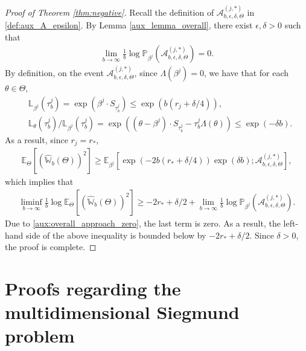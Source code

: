 \documentclass[aap,preprint]{imsart}
\newcommand{\Pro}{{\mathbb{P}}}
\newcommand{\Exp}{{\mathbb{E}}}
\theoremstyle{plain}
\theoremstyle{definition}
\begin{document}
\begin{appendix}
\begin{proof}[Proof of Theorem \ref{thm:negative}]
Recall the definition of $\mathcal{A}_{b,\epsilon,\delta,\Theta}^{(j,*)}$ in \eqref{def:aux_A_epsilon}. By Lemma \ref{aux_lemma_overall}, there exist  $\epsilon, \delta > 0$ such that
    \begin{align}\label{aux:overall_approach_zero}
       \lim_{b \to \infty}  \frac{1}{b} \log \Pro_{\beta^j}\left(\mathcal{A}_{b,\epsilon,\delta,\Theta}^{(j,*)} \right) = 0.
\end{align}
By definition, on the event $\mathcal{A}_{b,\epsilon,\delta,\Theta}^{(j,*)}$, since $\Lambda(\beta^j) = 0$, we have that for each $\theta \in \Theta$,
\begin{align*}
    &\mathbb{L}_{\beta^j}(\tau_b^j) = \exp(\beta^j \cdot S_{\tau_b^j}) \leq \exp\left( b(r_j + \delta/4)\right), \\
    &\mathbb{L}_{\theta}(\tau_b^j)/\mathbb{L}_{\beta^j}(\tau_b^j) =\exp\left( (\theta - \beta^j) \cdot S_{\tau_b^j} - \tau_b^j \Lambda(\theta) \right)  \leq \exp\left(-\delta b\right).
\end{align*}
 As a result, since $r_j = r_*$,
\begin{align*}
\Exp_{\Theta}\left[ \left(\widehat{\mathbb{W}}_{b}(\Theta) \right)^2  \right]  
\geq \Exp_{\beta^j} \left[
\exp\left(-2b(r_* + \delta/4)\right) 
\exp\left(\delta b\right); \mathcal{A}_{b,\epsilon,\delta,\Theta}^{(j,*)}
\right],
\end{align*}
which implies that
\begin{align*}
    \liminf_{b \to \infty} \frac{1}{b}\log \Exp_{\Theta}\left[ \left(\widehat{\mathbb{W}}_{b}(\Theta) \right)^2  \right] \geq -2r_* + \delta/2 +  \lim_{b \to \infty}  \frac{1}{b} \log \Pro_{\beta^j}\left(\mathcal{A}_{b,\epsilon,\delta,\Theta}^{(j,*)} \right).
\end{align*}
Due to \eqref{aux:overall_approach_zero}, the last term is zero. As a result, the left-hand side of the above inequality is bounded below by $-2r_* + \delta/2$. 
Since $\delta > 0$, the proof is complete.
\end{proof}


\section{Proofs regarding the multidimensional Siegmund problem}
\label{app:multi_ruin}


\end{appendix}
\end{document}
